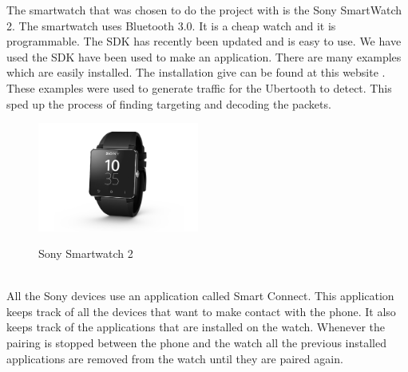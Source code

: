 \label{subsec:sw2}
The smartwatch that was chosen to do the project with is the Sony SmartWatch 2. The smartwatch uses Bluetooth 3.0. It is a cheap watch and it is programmable. The SDK has recently been updated and is easy to use. We have used the SDK have been used to make an application. There are many examples which are easily installed. The installation give can be found at this website \cite{sw2_install}. These examples were used to generate traffic for the Ubertooth to detect. This sped up the process of finding targeting and decoding the packets. 
\begin{figure}[!h]
  \begin{center}
	\includegraphics[width=200px]{images/sw2.jpg}
	\label{fig:sw2}
	\caption{Sony Smartwatch 2}
  \end{center}
\end{figure}
\\

All the Sony devices use an application called Smart Connect. This application keeps track of all the devices that want to make contact with the phone. It also keeps track of the applications that are installed on the watch. Whenever the pairing is stopped between the phone and the watch all the previous installed applications are removed from the watch until they are paired again.
